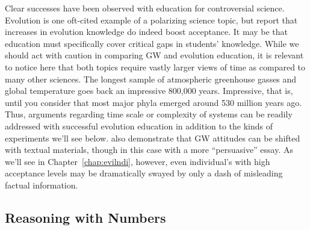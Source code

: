 
Clear successes have been observed with education for controversial science.
Evolution is one oft-cited example of a polarizing science topic, but
\textcite{shtulman_learning_2008} report that increases in evolution knowledge
do indeed boost acceptance. It may be that education must specifically
cover critical gaps in students' knowledge. While we should act with caution in
comparing GW and evolution education, it is relevant to notice here that both
topics require
vastly larger views of time as compared to many other sciences. The longest
sample of atmospheric greenhouse gasses and global temperature goes back an
impressive 800,000 years.  Impressive, that is, until you consider that most
major phyla emerged around 530 million years ago. Thus, arguments regarding time
scale or complexity of systems can be readily addressed with successful
evolution education in addition to the kinds of experiments we'll see below.
\textcite{sinatra_promoting_2012} also demonstrate that GW attitudes can be shifted
with textual materials, though in this case with a more “persuasive” essay. As
we'll see in Chapter~\ref{chap:evilndi}, however, even individual's with high
acceptance levels may be dramatically swayed by only a dash of misleading
factual information. 

\subsection{Reasoning with Numbers \label{sec:ndi}}


